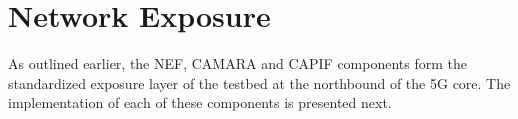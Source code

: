 \section{Network Exposure}
\label{chap:impl:exposure}

As outlined earlier, the \acs{NEF}, CAMARA and \acs{CAPIF} components form the standardized exposure layer of the testbed at the northbound of the \acs{5G} core. The implementation of each of these components is presented next.




